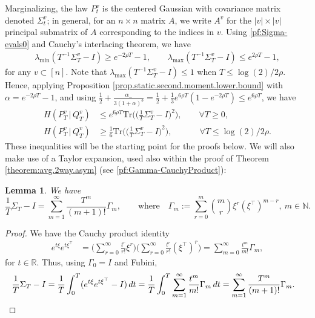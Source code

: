 \documentclass[11pt,reqno]{amsart}
\numberwithin{equation}{section}
\newtheorem{lemma}[theorem]{Lemma}
\theoremstyle{definition}
\def\BB{{\Gamma}}
\def\N{{\mathbb N}}
\def\R{{\mathbb R}}
\def\tr{{\mathrm{Tr}}}
\begin{document}
Marginalizing, the law $P^v_t$ is the centered Gaussian with covariance matrix denoted $\Sigma_t^v$; in general, for an $n \times n$ matrix $A$, we write $A^v$ for the $|v| \times |v|$ principal submatrix of $A$ corresponding to the indices in $v$.
Using \eqref{pf:Sigma-evals0} and Cauchy's interlacing theorem, we have
\begin{align}
\lambda_{\mathrm{min}}(T^{-1}\Sigma^v_T-I) \ge  e^{-2\rho T}-1, \qquad \lambda_{\mathrm{max}}(T^{-1}\Sigma^v_T-I) \le e^{2\rho T}-1, \label{pf:Sigma-evals}
\end{align}
for any $v \subset [n]$.
Note that  $\lambda_{\mathrm{max}}(T^{-1}\Sigma^v_T-I) \le 1$ when $T \le \log(2)/2\rho$.
Hence, applying Proposition \ref{prop.static.second.moment.lower.bound} with $\alpha =  e^{-2\rho T}-1$, and using $\frac12 + \frac{\alpha_-}{3(1+\alpha)^3}=  \frac{1}{2} + \frac13 e^{6 \rho T}(1-e^{-2\rho T}) \le e^{6\rho T} $, we have
\begin{align}
H(P^v_T\,|\,Q^v_T) &\le e^{6\rho T}  \tr \Big(\Big(\frac{1}{T}\Sigma^v_T - I\Big)^2\Big), \quad\quad \forall T \ge 0, \label{pf:Guassian-UB} \\
H(P^v_T\,|\,Q^v_T) &\ge \frac16\tr \Big(\Big(\frac{1}{T}\Sigma^v_T - I\Big)^2\Big), \quad\quad\quad  \ \forall T \le \log(2)/2\rho. \label{pf:Guassian-LB}
\end{align} 
These inequalities will be the starting point for the proofs below. We will also make use of a Taylor expansion, used also within the proof of Theorem \ref{theorem:avg.2way.asym} (see \eqref{pf:Gamma-CauchyProduct}):

\begin{lemma} \label{le:Gaussianseries}
We have
\begin{equation*}
\frac{1}{T}\Sigma_T - I = \sum_{m=1}^{\infty} \frac{T^m}{(m+1)!} \BB_m, \qquad \text{where} \quad \BB_m := \sum_{r=0}^m {m \choose r} \xi^r (\xi^\top)^{m-r}, \ m \in \N.
\end{equation*}
\end{lemma}
\begin{proof}
We have the Cauchy product identity
\begin{align*}
e^{  t\xi} e^{ t\xi^\top} &= \bigg(\sum_{r=0}^\infty  \frac{t^r}{r!} \xi^r\bigg)\bigg(\sum_{r=0}^\infty  \frac{t^r}{r!}  (\xi^\top)^r\bigg) =  \sum_{m=0}^\infty \frac{t^m}{m!} \BB_m , 
\end{align*}
for $t \in \R$. Thus, using $\Gamma_0=I$ and Fubini,
\begin{align*}
\frac{1}{T}\Sigma_T - I &= \frac{1}{T}\int_0^T(e^{  t\xi} e^{ t\xi^\top} - I)\,dt = \frac{1}{T}\int_0^T\sum_{m=1}^\infty \frac{t^m}{m!} \BB_m \, dt = \sum_{m=1}^{\infty} \frac{T^m}{(m+1)!} \BB_m. \qedhere
\end{align*}
\end{proof}
\end{document}
